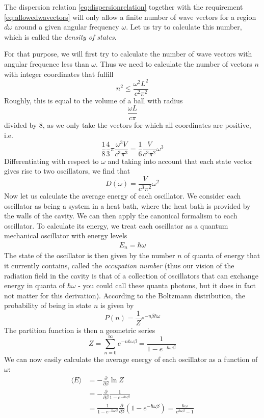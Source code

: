 \documentclass[a4paper, draft]{report}
\numberwithin{section}{chapter}
\numberwithin{equation}{chapter}
\theoremstyle{own}
\theoremstyle{remark}
\begin{document}
The dispersion relation  \eqref{eq:dispersionrelation} together with the requirement \eqref{eq:allowedwavectors} will only allow a finite number of wave vectors for a region $d\omega$ around a given angular frequency $\omega$. Let us try to calculate this number, which is called the {\em density of states}.

For that purpose, we will first try to calculate the number of wave vectors with angular frequence less than $\omega$. Thus we need to calculate the number of vectors $n$ with integer coordinates that fulfill
$$
n^2 \leq \frac{\omega^2 L^2}{c^2 \pi^2}
$$
Roughly, this is equal to the volume of a ball with radius
$$
\frac{\omega L}{c \pi}
$$
divided by $8$, as we only take the vectors for which all coordinates are positive, i.e. 
$$
\frac{1}{8} \frac{4}{3} \pi \frac{\omega^3 V}{c^3 \pi^3} = \frac{1}{6} \frac{V}{c^3 \pi^2}\omega^3
$$
Differentiating with respect to $\omega$ and taking into account that each state vector gives rise to two oscillators, we find that
$$
D(\omega) = \frac{V}{c^3 \pi^2}\omega^2 
$$
Now let us calculate the average energy of each oscillator. We consider each oscillator as being a system in a heat bath, where the heat bath is provided by the walls of the cavity. We can then apply the canonical formalism to each oscillator. To calculate its energy, we treat each oscillator as a quantum mechanical oscillator with energy levels
\begin{align}\label{eq:quantizationpostulate}
E_n = \hbar \omega 
\end{align}
The state of the oscillator is then given by the number $n$ of quanta of energy that it currently contains, called the {\em occupation number} (thus our vision of the radiation field in the cavity is that of a collection of oscillators that can exchange energy in quanta of $\hbar \omega$ - you could call these quanta photons, but it does in fact not matter for this derivation). According to the Boltzmann distribution, the probability of being in state $n$ is given by
$$
P(n) = \frac{1}{Z} e^{-n\beta \hbar \omega}
$$
The partition function is then a geometric series
$$
Z = \sum_{n=0}^\infty e^{-n\hbar \omega \beta} = \frac{1}{1 - e^{-\hbar \omega \beta}}
$$
We can now easily calculate the average energy of each oscillator as a function of $\omega$:
\begin{align*}
\langle E \rangle &= - \frac{\partial}{\partial \beta} \ln Z \\
&= - \frac{\partial}{\partial \beta}  \frac{1}{1 - e^{-\hbar \omega \beta}} \\
&= \frac{1}{1 - e^{-\hbar \omega \beta}} \frac{\partial}{\partial \beta}
(1 - e^{-\hbar \omega \beta}) = \frac{\hbar \omega}{e^{\hbar \omega \beta} - 1}
\end{align*}
\end{document}
